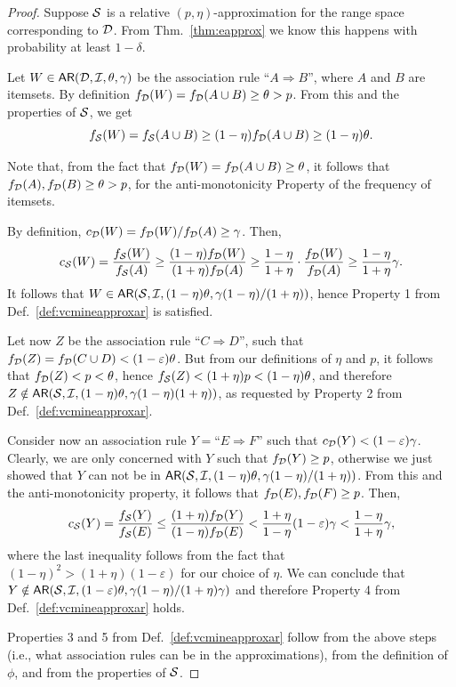 \begin{proof}
  Suppose ${\cal S}$ is a relative $(p,\eta)$-approximation for the range space
  corresponding to ${\cal D}$. From Thm.~\ref{thm:eapprox} we know this happens with
  probability at least $1-\delta$.

 Let $W\in\mathsf{AR}({\cal D},{\cal I},\theta,\gamma)$ be the association rule ``$A\Rightarrow
 B$'', where $A$ and $B$ are itemsets. By definition $f_{\cal D}(W)=f_{\cal D}(A\cup
 B)\ge\theta> p$. From this and the properties of ${\cal S}$, we get
\[
 f_{\cal S}(W)=f_{\cal S}(A\cup B)\ge (1-\eta)f_{\cal D}(A\cup B)\ge (1-\eta)\theta.\] 

Note that, from the fact that $f_{\cal D}(W)=f_{\cal D}(A\cup B)\ge\theta$, it follows
that $f_{\cal D}(A),f_{\cal D}(B)\ge\theta> p$, for the anti-monotonicity Property of the
frequency of itemsets.

By definition, $c_{\cal D}(W)=f_{\cal D}(W)/f_{\cal D}(A)\ge\gamma$. Then,
 \[
 c_{\cal S}(W)=\frac{f_{\cal S}(W)}{f_{\cal S}(A)}\ge
 \frac{(1-\eta)f_{\cal D}(W)}{(1+\eta)f_{\cal D}(A)}\ge\frac{1-\eta}{1+\eta}\cdot\frac{f_{\cal D}(W)}{f_{\cal D}(A)}\ge\frac{1-\eta}{1+\eta}\gamma.\]
 It follows that
 $W\in\mathsf{AR}({\cal S},{\cal I},(1-\eta)\theta,\gamma(1-\eta)/(1+\eta))$, hence
 Property 1 from Def.~\ref{def:vcmineapproxar} is satisfied.

 Let now $Z$ be the association rule ``$C\Rightarrow D$'', such that
 $f_{\cal D}(Z)=f_{\cal D}(C\cup D)<(1-\varepsilon)\theta$. But from our definitions of
 $\eta$ and $p$, it follows that $f_{\cal D}(Z) < p < \theta$, hence $f_{\cal S}(Z) <
 (1+\eta)p < (1-\eta)\theta$, and therefore
 $Z\notin\mathsf{AR}({\cal S},{\cal I},(1-\eta)\theta,\gamma(1-\eta)(1+\eta))$, as
 requested by Property 2 from Def.~\ref{def:vcmineapproxar}.
 
 Consider now an association rule $Y=\mbox{``}E\Rightarrow F\mbox{''}$ such that
 $c_{\cal D}(Y)<(1-\varepsilon)\gamma$. Clearly, we are only concerned with $Y$ such
 that $f_{\cal D}(Y)\ge p$, otherwise we just showed that $Y$ can not be in
 $\mathsf{AR}({\cal S},{\cal I},(1-\eta)\theta,\gamma(1-\eta)/(1+\eta))$. From this and the
 anti-monotonicity property, it follows that $f_{\cal D}(E),f_{\cal D}(F)\ge p$. Then,
 \[
  c_{\cal S}(Y)=\frac{f_{\cal S}(Y)}{f_{\cal S}(E)}\le\frac{(1+\eta)f_{\cal D}(Y)}{(1-\eta)f_{\cal D}(E)}
  <\frac{1+\eta}{1-\eta} (1-\varepsilon)\gamma < \frac{1-\eta}{1+\eta}\gamma,\]
where the last inequality follows from the fact that
$(1-\eta)^2>(1+\eta)(1-\varepsilon)$ for our choice of $\eta$. We can
conclude that
$Y\notin\mathsf{AR}({\cal S},{\cal I},(1-\varepsilon)\theta,\gamma(1-\eta)/(1+\eta)\gamma)$ and
therefore Property 4 from Def.~\ref{def:vcmineapproxar} holds.

  Properties 3 and 5 from Def.~\ref{def:vcmineapproxar} follow from the above steps (i.e.,
  what association rules can be in the approximations), from the definition of
  $\phi$, and from the properties of ${\cal S}$.
\end{proof}

